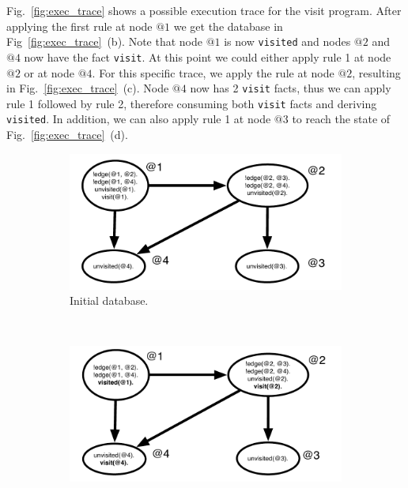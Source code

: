 Fig.~\ref{fig:exec_trace} shows a possible execution trace for the visit program.
After applying the first rule at node $@1$ we get the database in Fig~\ref{fig:exec_trace}~(b).
Note that node $@1$ is now \texttt{visited} and nodes $@2$
and $@4$ now have the fact \texttt{visit}. At this point we could either apply rule 1 at
node $@2$ or at node $@4$. For this specific trace, we apply the rule at node $@2$, resulting
in Fig.~\ref{fig:exec_trace}~(c). Node $@4$ now has 2 \texttt{visit} facts, thus
we can apply rule 1 followed by rule 2, therefore consuming both \texttt{visit} facts
and deriving \texttt{visited}. In addition, we can also apply rule 1 at node $@3$ to
reach the state of Fig.~\ref{fig:exec_trace}~(d).

\begin{figure}[h]
        \centering
        \begin{subfigure}[b]{0.5\textwidth}
                \includegraphics[width=\textwidth]{execution_trace1}
                \caption{Initial database.}
                \label{fig:exec_trace1}
        \end{subfigure}%
        ~ %
        \begin{subfigure}[b]{0.5\textwidth}
                \includegraphics[width=\textwidth]{execution_trace2}

\end{subfigure}
\end{figure}
